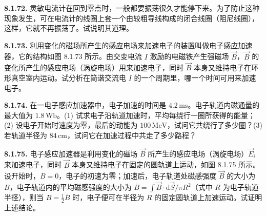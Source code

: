 \vfill
\newpage

\textbf{8.1.72.} 灵敏电流计在回到零点时，一般都要振荡很久才能停下来。为了防止这种现象发生，可在电流计的线圈上套一个由较粗导线构成的闭合线圈（阻尼线圈），这样，它就不再振荡了。试说明其道理。

\vfill
\newpage

\textbf{8.1.73.} 利用变化的磁场所产生的感应电场来加速电子的装置叫做电子感应加速器，它的结构如图 8.1.73 所示。由交变电流 $I$ 激励的电磁铁产生强磁场 $\vec{B}$，$\vec{B}$ 的变化所产生的感应电场（涡旋电场）用来加速电子，同时 $\vec{B}$ 本身又维持电子在环形真空室内运动。试分析在简谐交流电 $I$ 的一个周期里，哪一个时间可用来加速电子。

\begin{center}
  \begin{minipage}[b]{0.47\linewidth}
    \centering
  \end{minipage}\hfill
  \begin{minipage}[b]{0.47\linewidth}
    \centering
  \end{minipage}
\end{center}

\vfill
\newpage

\textbf{8.1.74.} 在一电子感应加速器中，电子加速的时间是 $4.2\,\mathrm{ms}$。电子轨道内磁通量的最大值为 $1.8\,\mathrm{Wb}$。(1) 试求电子沿轨道加速时，平均每绕行一圈所获得的能量；(2) 设电子开始时速度为零，最后的动能为 $100\,\mathrm{MeV}$，试问它共绕行了多少圈？(3) 若轨道半径为 $84\,\mathrm{cm}$，试问它在加速过程中共走了多少路程？

\vfill
\newpage

\textbf{8.1.75.} 电子感应加速器是利用变化的磁场 $\vec{B}$ 所产生的感应电场（涡旋电场）$\vec{E}_{i}$ 来加速电子，同时 $\vec{B}$ 本身又维持电子在固定的圆轨道上运动，如图 8.1.75 所示。设开始时，$B = 0$，电子的初速为零；加速后，电子轨道处磁感强度 $\vec{B}$ 的大小为 $B$，电子轨道内的平均磁感强度的大小为 $\displaystyle \overline{B} = \int \vec{B} \cdot \mathrm{d}\vec{S} / \pi R^2$（式中 $R$ 为电子轨道半径），则当 $\displaystyle B = \frac{1}{2} \overline{B}$ 时，电子便可在半径为 $R$ 的固定圆轨道上加速运动。试证明上述结论。

\begin{center}
\end{center}

\vfill
\newpage

